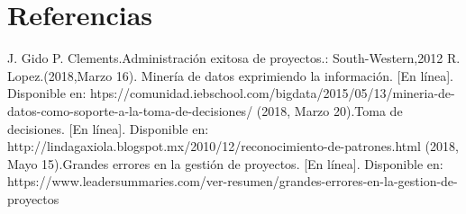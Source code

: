 \chapter{Referencias}
\renewcommand{\bibname}{Referencias}
\begin{thebibliography}{1000}

   J. Gido P. Clements.Administración exitosa de proyectos.: South-Western,2012
   R. Lopez.(2018,Marzo 16). Minería de datos exprimiendo la información. [En línea]. Disponible en: htps://comunidad.iebschool.com/bigdata/2015/05/13/mineria-de-datos-como-soporte-a-la-toma-de-decisiones/ 
  (2018, Marzo 20).Toma de decisiones. [En línea]. Disponible en: http://lindagaxiola.blogspot.mx/2010/12/reconocimiento-de-patrones.html 
  (2018, Mayo 15).Grandes errores en la gestión de proyectos. [En línea]. Disponible en: https://www.leadersummaries.com/ver-resumen/grandes-errores-en-la-gestion-de-proyectos 
  

\end{thebibliography}
